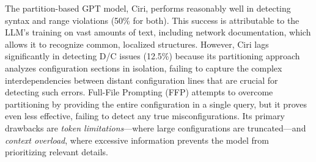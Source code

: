 \begin{table}[t]
\centering
{}
\caption{Comparison of misconfiguration detection on the synthetic dataset. The "Correct Config Updates" row indicates the number of false positives. Lower is better for that row.}
\label{tab:syn_result}
\end{table}

The partition-based GPT model, Ciri, performs reasonably well in detecting syntax and range violations (50\% for both). This success is attributable to the LLM's training on vast amounts of text, including network documentation, which allows it to recognize common, localized structures. However, Ciri lags significantly in detecting D/C issues (12.5\%) because its partitioning approach analyzes configuration sections in isolation, failing to capture the complex interdependencies between distant configuration lines that are crucial for detecting such errors.
Full-File Prompting (FFP) attempts to overcome partitioning by providing the entire configuration in a single query, but it proves even less effective, failing to detect any true misconfigurations. Its primary drawbacks are \textit{token limitations}—where large configurations are truncated—and \textit{context overload}, where excessive information prevents the model from prioritizing relevant details.

